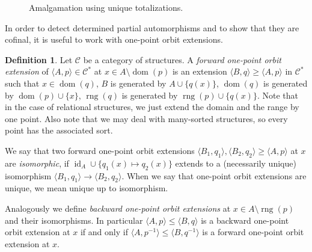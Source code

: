 \documentclass[oneside,notitlepage,12pt]{article}
\theoremstyle{definition}
\newtheorem{df}[tw]{Definition}
\theoremstyle{remark}
\newcommand \set [1]{\{#1\}}
\newcommand \seq [1]{\langle #1 \rangle}
\newcommand \restr [1] {\mathord{\upharpoonright}_{#1}}
\newcommand \id [1]{{\operatorname{id}_{#1}}}
\newcommand \dom {\operatorname{dom}}
\newcommand \rng {\operatorname{rng}}
\newcommand \C {\mathscr{C}}
\begin{document}
\begin{figure}[!ht]
    \centering
{}
    \caption{Amalgamation using unique totalizations.}
    \label{fig:amalgamation_from_totalization}
\end{figure}


In order to detect determined partial automorphisms and to show that they are cofinal, it is useful to work with one-point orbit extensions.

\begin{df}
Let $\C$ be a category of structures.
A \emph{forward one-point orbit extension} of $\seq{A, p} \in \C^*$ at $x \in A \setminus \dom(p)$ is an extension $\seq{B, q} \geq \seq{A, p}$ in $\C^*$ such that $x \in \dom(q)$, $B$ is generated by $A \cup \set{q(x)}$, $\dom(q)$ is generated by $\dom(p) \cup \set{x}$, $\rng(q)$ is generated by $\rng(p) \cup \set{q(x)}$.
Note that in the case of relational structures, we just extend the domain and the range by one point.
Also note that we may deal with many-sorted structures, so every point has the associated sort.

We say that two forward one-point orbit extensions $\seq{B_1, q_1}, \seq{B_2, q_2} \geq \seq{A, p}$ at $x$ are {\it isomorphic}, if $\id{A} \cup \{q_1(x) \mapsto q_2(x)\}$ extends to a (necessarily unique) isomorphism $\seq{B_1, q_1} \to \seq{B_2, q_2}$.
When we say that one-point orbit extensions are unique, we mean unique up to isomorphism.

Analogously we define \emph{backward one-point orbit extensions} at $x \in A \setminus \rng(p)$ and their isomorphisms.
In particular $\seq{A, p} \leq \seq{B, q}$ is a backward one-point orbit extension at $x$ if and only if $\seq{A, p^{-1}} \leq \seq{B, q^{-1}}$ is a forward one-point orbit extension at $x$.
\end{df}
\end{document}
